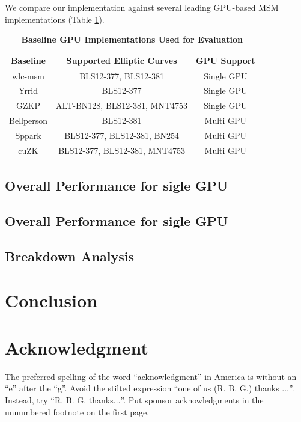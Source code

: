\documentclass[conference]{IEEEtran}
\begin{document}
We compare our implementation against several leading GPU-based MSM implementations (Table \ref{tab:baseline-gpu-implementations}).
\begin{table}[htbp]
    \caption{\textbf{Baseline GPU Implementations Used for Evaluation}} %
    \begin{center}
    \begin{tabular}{|c|c|c|}
    \hline
    \textbf{Baseline} & \textbf{Supported Elliptic Curves} & \textbf{GPU Support} \\
    \hline
    wlc-msm & BLS12-377, BLS12-381 & Single GPU \\
    \hline
    Yrrid & BLS12-377 & Single GPU \\
    \hline
    GZKP & ALT-BN128, BLS12-381, MNT4753 & Single GPU \\
    \hline
    Bellperson & BLS12-381 & Multi GPU \\
    \hline
    Sppark & BLS12-377, BLS12-381, BN254 & Multi GPU \\
    \hline
    cuZK & BLS12-377, BLS12-381, MNT4753 & Multi GPU \\
    \hline
    \end{tabular}
    \label{tab:baseline-gpu-implementations} %
    \end{center}
\end{table}


\subsection{Overall Performance for sigle GPU}
\todo{}

\subsection{Overall Performance for sigle GPU}
\todo{}

\subsection{Breakdown Analysis}
\todo{}
\section{Conclusion}
\todo{}
\section*{Acknowledgment}

The preferred spelling of the word ``acknowledgment'' in America is without 
an ``e'' after the ``g''. Avoid the stilted expression ``one of us (R. B. 
G.) thanks $\ldots$''. Instead, try ``R. B. G. thanks$\ldots$''. Put sponsor 
acknowledgments in the unnumbered footnote on the first page.
\end{document}
